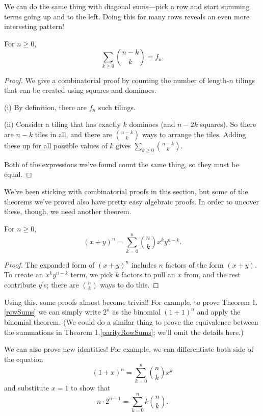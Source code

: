 \documentclass[../m055main.tex]{subfiles}
\begin{document}
We can do the same thing with diagonal sums---pick a row and start summing terms going up and to the left.
Doing this for many rows reveals an even more interesting pattern!

\begin{theorem}
    For $n \geq 0$,
    \[ \sum_{k \geq 0} \binom{n-k}{k} = f_n. \]
\end{theorem}

\begin{proof}
    We give a combinatorial proof by counting the number of length-$n$ tilings that can be created using squares and dominoes.
    \smallskip

    (i) By definition, there are $f_n$ such tilings.
    \smallskip

    (ii) Consider a tiling that has exactly $k$ dominoes (and $n-2k$ squares).
    So there are $n-k$ tiles in all, and there are $\binom{n-k}{k}$ ways to arrange the tiles.
    Adding these up for all possible values of $k$ gives $\sum\limits_{k \geq 0} \binom{n-k}{k}$.

    Both of the expressions we've found count the same thing, so they must be equal.
\end{proof}

We've been sticking with combinatorial proofs in this section, but some of the theorems we've proved also have pretty easy algebraic proofs.
In order to uncover these, though, we need another theorem.

\begin{theorem}
    For $n \geq 0$,
    \[ (x+y)^{n} = \sum_{k=0}^{n} \binom{n}{k} x^{k} y^{n-k}. \]
\end{theorem}

\begin{proof}
    The expanded form of $(x+y)^{n}$ includes $n$ factors of the form $(x+y)$.
    To create an $x^{k} y^{n-k}$ term, we pick $k$ factors to pull an $x$ from, and the rest contribute $y$'s; there are $\binom{n}{k}$ ways to do this.
\end{proof}

Using this, some proofs almost become trivial!
For example, to prove Theorem 1.\ref{rowSums} we can simply write $2^{n}$ as the binomial $(1+1)^{n}$ and apply the binomial theorem.
(We could do a similar thing to prove the equivalence between the summations in Theorem 1.\ref{parityRowSums}; we'll omit the details here.)

We can also prove new identities!
For example, we can differentiate both side of the equation
\[ (1+x)^{n} = \sum_{k=0}^{n} \binom{n}{k} x^{k} \]
and substitute $x=1$ to show that
\[ n \cdot 2^{n-1} = \sum_{k=0}^{n} k \binom{n}{k}. \]
\end{document}
